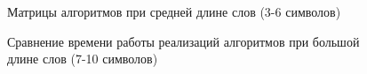 \begin{figure}[h!]
	\caption{Матрицы алгоритмов при средней длине слов (3-6 символов)}
	\label{fig:котскат_матрица}
\end{figure}

\begin{figure}[h!]
	\caption{Сравнение времени работы реализаций алгоритмов при большой длине слов (7-10 символов)}
	\label{fig:длинное}
\end{figure}

